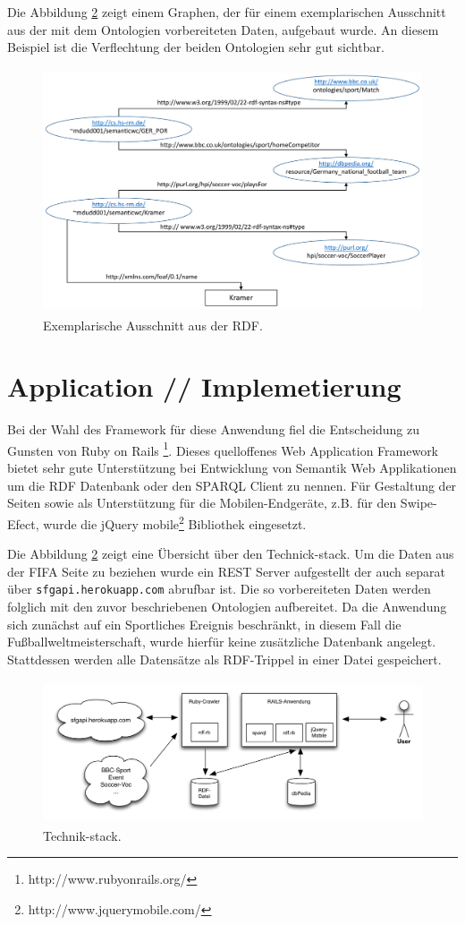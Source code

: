 \documentclass[runningheads,a4paper]{llncs}
\begin{document}
Die Abbildung \ref{fig:example} zeigt einem Graphen, der für einem exemplarischen Ausschnitt aus der mit dem Ontologien vorbereiteten Daten, aufgebaut wurde. An diesem Beispiel ist die Verflechtung der beiden Ontologien sehr gut sichtbar.

\begin{figure}
\centering
\includegraphics[height=7.2cm]{graph_manus}
\caption{Exemplarische Ausschnitt aus der RDF.}
\label{fig:example}
\end{figure}

\newpage
\section{Application // Implemetierung}


Bei der Wahl des Framework für diese Anwendung fiel die Entscheidung zu Gunsten von Ruby on Rails \footnote{http://www.rubyonrails.org/}. Dieses quelloffenes Web Application Framework bietet sehr gute Unterstützung bei Entwicklung von Semantik Web Applikationen um die RDF Datenbank oder den SPARQL Client zu nennen. Für Gestaltung der Seiten sowie als Unterstützung für die Mobilen-Endgeräte, z.B. für den Swipe-Efect,  wurde die jQuery mobile\footnote{http://www.jquerymobile.com/} Bibliothek eingesetzt. 

Die Abbildung \ref{fig:example} zeigt eine Übersicht über den Technick-stack. Um die Daten aus der FIFA Seite zu beziehen wurde ein REST Server aufgestellt der auch separat über \texttt{sfgapi.herokuapp.com} abrufbar ist. Die so vorbereiteten Daten werden folglich mit den zuvor beschriebenen Ontologien aufbereitet. Da die Anwendung sich zunächst auf ein Sportliches Ereignis beschränkt, in diesem Fall die Fußballweltmeisterschaft, wurde hierfür keine zusätzliche Datenbank angelegt. Stattdessen werden alle Datensätze als RDF-Trippel in einer Datei gespeichert.
\begin{figure}
\centering
\includegraphics[height=4.2cm]{technik-stack}
\caption{Technik-stack.}
\label{fig:example}
\end{figure}
\end{document}
